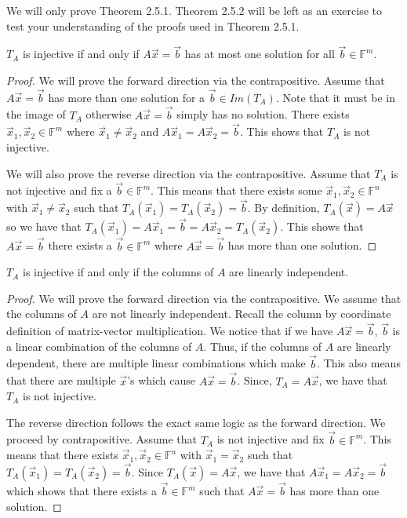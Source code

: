 We will only prove Theorem 2.5.1. Theorem 2.5.2 will be left as an exercise to test your understanding of the proofs used in Theorem 2.5.1.
\begin{lemma}
    $T_A$ is injective if and only if $A\vec{x}=\vec{b}$ has at most one solution for all $\vec{b}\in\mathbb{F}^m$.
\end{lemma}
\begin{proof}
    We will prove the forward direction via the contrapositive. Assume that $A\vec{x}=\vec{b}$ has more than one solution for a $\vec{b}\in Im(T_A)$. Note that it must be in the image of $T_A$ otherwise $A\vec{x}=\vec{b}$ simply has no solution. There exists $\vec{x}_1,\vec{x}_2\in\mathbb{F}^m$ where $\vec{x}_1\neq\vec{x}_2$ and $A\vec{x}_1=A\vec{x}_2=\vec{b}$. This shows that $T_A$ is not injective.

    We will also prove the reverse direction via the contrapositive. Assume that $T_A$ is not injective and fix a $\vec{b}\in\mathbb{F}^m$. This means that there exists some $\vec{x}_1,\vec{x}_2\in\mathbb{F}^n$ with $\vec{x}_1\neq\vec{x}_2$ such that $T_A(\vec{x}_1)=T_A(\vec{x}_2)=\vec{b}$. By definition, $T_A(\vec{x})=A\vec{x}$ so we have that $T_A(\vec{x}_1)=A\vec{x}_1=\vec{b}=A\vec{x}_2=T_A(\vec{x}_2)$. This shows that $A\vec{x}=\vec{b}$ there exists a $\vec{b}\in\mathbb{F}^m$ where $A\vec{x}=\vec{b}$ has more than one solution.
\end{proof}
\begin{lemma}
    $T_A$ is injective if and only if the columns of $A$ are linearly independent.
\end{lemma}
\begin{proof}
    We will prove the forward direction via the contrapositive. We assume that the columns of $A$ are not linearly independent. Recall the column by coordinate definition of matrix-vector multiplication. We notice that if we have $A\vec{x}=\vec{b}$, $\vec{b}$ is a linear combination of the columns of $A$. Thus, if the columns of $A$ are linearly dependent, there are multiple linear combinations which make $\vec{b}$. This also means that there are multiple $\vec{x}$'s which cause $A\vec{x}=\vec{b}$. Since, $T_A=A\vec{x}$, we have that $T_A$ is not injective.

    The reverse direction follows the exact same logic as the forward direction. We proceed by contrapositive. Assume that $T_A$ is not injective and fix $\vec{b}\in\mathbb{F}^m$. This means that there exists $\vec{x}_1,\vec{x}_2\in\mathbb{F}^n$ with $\vec{x}_1=\vec{x}_2$ such that $T_A(\vec{x}_1)=T_A(\vec{x}_2)=\vec{b}$. Since $T_A(\vec{x})=A\vec{x}$, we have that $A\vec{x}_1=A\vec{x}_2=\vec{b}$ which shows that there exists a $\vec{b}\in\mathbb{F}^m$ such that $A\vec{x}=\vec{b}$ has more than one solution.
\end{proof}

